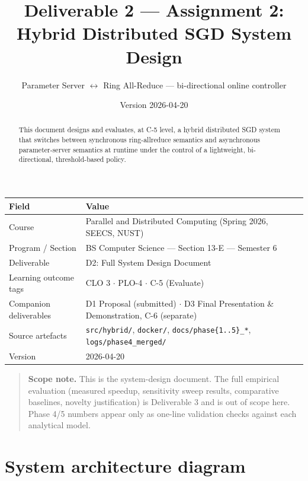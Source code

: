 \documentclass[11pt,a4paper]{article}
\title{Deliverable 2 --- Assignment 2:\\Hybrid Distributed SGD System Design}
\author{Parameter Server $\leftrightarrow$ Ring All-Reduce --- bi-directional online controller}
\date{Version 2026-04-20}
\begin{document}
\maketitle

\begin{table}[htbp]
  \centering
  \small
  \begin{tabularx}{\linewidth}{@{}l L@{}}
    \toprule
    \textbf{Field} & \textbf{Value} \\
    \midrule
    Course & Parallel and Distributed Computing (Spring 2026, SEECS, NUST) \\
    Program / Section & BS Computer Science --- Section 13-E --- Semester 6 \\
    Deliverable & D2: Full System Design Document \\
    Learning outcome tags & CLO 3 $\cdot$ PLO-4 $\cdot$ C-5 (Evaluate) \\
    Companion deliverables & D1 Proposal (submitted) $\cdot$ D3 Final Presentation \& Demonstration, C-6 (separate) \\
    Source artefacts & \texttt{src/hybrid/}, \texttt{docker/}, \texttt{docs/phase\{1..5\}\_*}, \texttt{logs/phase4\_merged/} \\
    Version & 2026-04-20 \\
    \bottomrule
  \end{tabularx}
\end{table}

\begin{abstract}
\noindent
This document designs and evaluates, at C-5 level, a hybrid distributed SGD system that switches between synchronous ring-allreduce semantics and asynchronous parameter-server semantics at runtime under the control of a lightweight, bi-directional, threshold-based policy.
\end{abstract}

\begin{quote}
\textbf{Scope note.} This is the system-design document. The full empirical evaluation (measured speedup, sensitivity sweep results, comparative baselines, novelty justification) is Deliverable 3 and is out of scope here. Phase 4/5 numbers appear only as one-line validation checks against each analytical model.
\end{quote}

\section{System architecture diagram}
\end{document}
